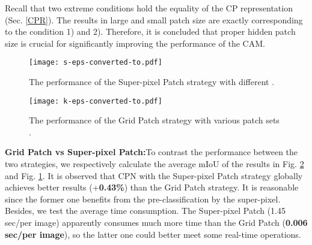 \documentclass[10pt,twocolumn,letterpaper]{article}
\begin{document}
Recall that two extreme conditions hold the equality of the CP representation (Sec. \ref{CPR}). The results in large and small patch size are exactly corresponding to the condition 1) and 2). Therefore, it is concluded that proper hidden patch size is crucial for significantly improving the performance of the CAM.
\begin{figure}
\begin{center}
\texttt{[image: s-eps-converted-to.pdf]}
\end{center}
\vspace{-4mm}
   \caption{The performance of the Super-pixel Patch strategy with different .}
\label{tab:ablation on ss}
\end{figure}
\begin{figure}
\begin{center}
\texttt{[image: k-eps-converted-to.pdf]}
\end{center}
   \caption{The performance of the Grid Patch strategy with various patch sets .}
\label{tab:ablation on sp}
\vspace{-2mm}
\end{figure}

\noindent\textbf{Grid Patch vs Super-pixel Patch:}\;To contrast the performance between the two strategies, we respectively calculate the average mIoU of the results in Fig. \ref{tab:ablation on sp} and Fig. \ref{tab:ablation on ss}. It is observed that CPN with the Super-pixel Patch strategy globally achieves better results (+\textbf{0.43\%}) than the Grid Patch strategy. It is reasonable since the former one benefits from the pre-classification by the super-pixel. Besides, we test the average time consumption. The Super-pixel Patch (1.45 sec/per image) apparently consumes much more time than the Grid Patch (\textbf{0.006 sec/per image}), so the latter one could better meet some real-time operations.
\end{document}
